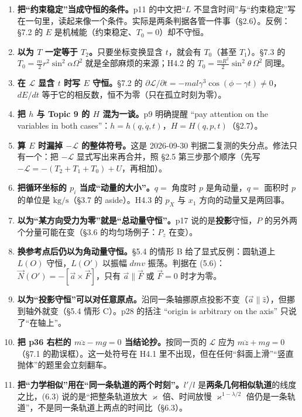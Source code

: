 \documentclass[11pt]{ctexart}
\begin{document}

\begin{enumerate}
\item \textbf{把“约束稳定”当成守恒的条件。}p11 的中文把“$L$ 不显含时间”与“约束稳定”写在一句里，读起来像一个条件。实际是两条判据各管一件事（§2.6）。反例：§7.2 的 $E$ 是机械能（约束稳定、$T_0=0$）却不守恒。
\item \textbf{以为 $T$ 一定等于 $T_2$。}只要坐标变换显含 $t$，就会有 $T_0$（甚至 $T_1$）。§7.3 的 $T_0=\frac{m}{2}r^2\sin^2\alpha\Omega^2$ 就是全部麻烦的来源；H4.2 的 $T_0=\frac{mR^2}{2}\sin^2\theta\,\Omega^2$ 同理。
\item \textbf{在 $\mathcal{L}$ 显含 $t$ 时写 $E$ 守恒。}§7.2 的 $\partial\mathcal{L}/\partial t=-mal\gamma^3\cos(\phi-\gamma t)\ne0$，$dE/dt$ 等于它的相反数，恒不为零（只在孤立时刻为零）。
\item \textbf{把 $h$ 与 Topic 9 的 $H$ 混为一谈。}p9 明确提醒 “pay attention on the variables in both cases”：$h=h(q,\dot q,t)$，$H=H(q,p,t)$（§2.7）。
\item \textbf{算 $E$ 时漏掉 $-\mathcal{L}$ 的整体符号。}这是 2026-09-30 判据二复测的失分点。修法只有一个：把 $-\mathcal{L}$ 显式写出来再合并，照 §2.5 第三步那个顺序（先写 $-\mathcal{L}=-(T_2+T_1+T_0)+U$，再相加）。
\item \textbf{把循环坐标的 $p_i$ 当成“动量的大小”。}$q=$ 角度时 $p$ 是角动量，$q=$ 面积时 $p$ 的单位是 $\mathrm{kg/s}$（§3.7 的 aside）。H4.3 的 $p_X$ 与 $x_1$ 方向的动量又是两回事。
\item \textbf{以为“某方向受力为零”就是“总动量守恒”。}p17 说的是\textbf{投影}守恒，$P$ 的另外两个分量可能在变（§3.6 的均匀场例子：$P_z$ 在变）。
\item \textbf{换参考点后仍以为角动量守恒。}§5.4 的情形 B 给了显式反例：圆轨道上 $L(O)$ 守恒，$L(O')$ 以振幅 $dmv$ 振荡。判据在 (5.6)：$\vec N(O')=-[\vec a\times\vec F]$，只有 $\vec a\parallel\vec F$ 或 $\vec F=0$ 时才为零。
\item \textbf{以为“投影守恒”可以对任意原点。}沿同一条轴挪原点投影不变（$\vec a\parallel\hat z$），但挪到轴外就变（§5.4 情形 C）。p28 的括注 “origin is arbitrary on the axis” 只说了“在轴上”。
\item \textbf{把 p36 右栏的 $m\ddot z-mg=0$ 当结论抄。}按同一页的 $\mathcal{L}$ 应为 $m\ddot z+mg=0$（§7.1 的勘误框）。这一处符号在 H4.1 里不出现，但在任何“斜面上滑”“竖直抛体”的题里会立刻翻车。
\item \textbf{把“力学相似”用在“同一条轨道的两个时刻”。}$l'/l$ 是\textbf{两条几何相似轨道}的线度之比，(6.3) 说的是“把整条轨道放大 $\varkappa$ 倍、时间放慢 $\varkappa^{1-\lambda/2}$ 倍仍是一条轨道”，不是同一条轨道上两点的时间比（§6.3）。
\end{enumerate}
\end{document}
